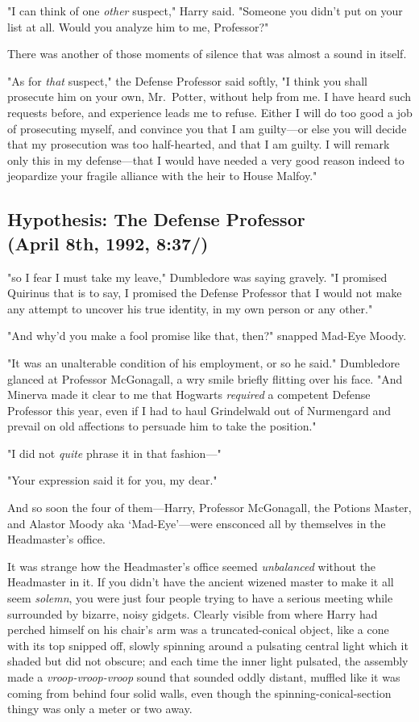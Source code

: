 "I can think of one \emph{other} suspect," Harry said. "Someone you didn't put
on your list at all. Would you analyze him to me, Professor?"

There was another of those moments of silence that was almost a sound in itself.

"As for \emph{that} suspect," the Defense Professor said softly, "I think you
shall prosecute him on your own, Mr.~Potter, without help from me. I have heard
such requests before, and experience leads me to refuse. Either I will do too
good a job of prosecuting myself, and convince you that I am guilty---or else
you will decide that my prosecution was too half-hearted, and that I am guilty.
I will remark only this in my defense---that I would have needed a very good
reason indeed to jeopardize your fragile alliance with the heir to House
Malfoy."
\sbreak
\vspace{-2\baselineskip}
\subsection{Hypothesis: The Defense Professor\\
(April 8th, 1992, 8:37\PM/)}

"{\el}so I fear I must take my leave," Dumbledore was saying gravely. "I
promised Quirinus{\el} that is to say, I promised the Defense
Professor{\el} that I would not make any attempt to uncover his true
identity, in my own person or any other."

"And why'd you make a fool promise like that, then?" snapped Mad-Eye Moody.

"It was an unalterable condition of his employment, or so he said." Dumbledore
glanced at Professor McGonagall, a wry smile briefly flitting over his face.
"And Minerva made it clear to me that Hogwarts \emph{required} a competent
Defense Professor this year, even if I had to haul Grindelwald out of
Nurmengard and prevail on old affections to persuade him to take the position."

"I did not \emph{quite} phrase it in that fashion---"

"Your expression said it for you, my dear."

And so soon the four of them---Harry, Professor McGonagall, the Potions Master,
and Alastor Moody aka `Mad-Eye'---were ensconced all by themselves in the
Headmaster's office.

It was strange how the Headmaster's office seemed{\el}
\emph{unbalanced{\el}} without the Headmaster in it. If you didn't have the
ancient wizened master to make it all seem \emph{solemn}, you were just four
people trying to have a serious meeting while surrounded by bizarre, noisy
gidgets. Clearly visible from where Harry had perched himself on his chair's
arm was a truncated-conical object, like a cone with its top snipped off,
slowly spinning around a pulsating central light which it shaded but did not
obscure; and each time the inner light pulsated, the assembly made a
\emph{vroop-vroop-vroop} sound that sounded oddly distant, muffled like it was
coming from behind four solid walls, even though the spinning-conical-section
thingy was only a meter or two away.

